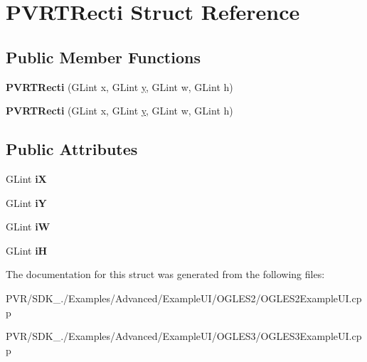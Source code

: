 \hypertarget{struct_p_v_r_t_recti}{\section{P\+V\+R\+T\+Recti Struct Reference}
\label{struct_p_v_r_t_recti}
}
\subsection*{Public Member Functions}
\begin{DoxyCompactItemize}
\item 
\hypertarget{struct_p_v_r_t_recti_afe79dc6cdc41ad82738ae557368a467b}{{\bfseries P\+V\+R\+T\+Recti} (G\+Lint x, G\+Lint \hyperlink{_ice_utils_8h_aa7ffaed69623192258fb8679569ff9ba}{y}, G\+Lint w, G\+Lint h)}\label{struct_p_v_r_t_recti_afe79dc6cdc41ad82738ae557368a467b}

\item 
\hypertarget{struct_p_v_r_t_recti_afe79dc6cdc41ad82738ae557368a467b}{{\bfseries P\+V\+R\+T\+Recti} (G\+Lint x, G\+Lint \hyperlink{_ice_utils_8h_aa7ffaed69623192258fb8679569ff9ba}{y}, G\+Lint w, G\+Lint h)}\label{struct_p_v_r_t_recti_afe79dc6cdc41ad82738ae557368a467b}

\end{DoxyCompactItemize}
\subsection*{Public Attributes}
\begin{DoxyCompactItemize}
\item 
\hypertarget{struct_p_v_r_t_recti_a5f00b5d7e5536378332be2cf1e8d18fa}{G\+Lint {\bfseries i\+X}}\label{struct_p_v_r_t_recti_a5f00b5d7e5536378332be2cf1e8d18fa}

\item 
\hypertarget{struct_p_v_r_t_recti_a7c05bdb2ece2d14426d2c952225b82ed}{G\+Lint {\bfseries i\+Y}}\label{struct_p_v_r_t_recti_a7c05bdb2ece2d14426d2c952225b82ed}

\item 
\hypertarget{struct_p_v_r_t_recti_a22faa5876b19c20f7c9aeb70e173e3a9}{G\+Lint {\bfseries i\+W}}\label{struct_p_v_r_t_recti_a22faa5876b19c20f7c9aeb70e173e3a9}

\item 
\hypertarget{struct_p_v_r_t_recti_ad7c9deefe85f75c00ed4c238bc104f2e}{G\+Lint {\bfseries i\+H}}\label{struct_p_v_r_t_recti_ad7c9deefe85f75c00ed4c238bc104f2e}

\end{DoxyCompactItemize}


The documentation for this struct was generated from the following files\+:\begin{DoxyCompactItemize}
\item 
P\+V\+R/\+S\+D\+K\+\_./\+Examples/\+Advanced/\+Example\+U\+I/\+O\+G\+L\+E\+S2/O\+G\+L\+E\+S2\+Example\+U\+I.\+cpp\item 
P\+V\+R/\+S\+D\+K\+\_./\+Examples/\+Advanced/\+Example\+U\+I/\+O\+G\+L\+E\+S3/O\+G\+L\+E\+S3\+Example\+U\+I.\+cpp\end{DoxyCompactItemize}
